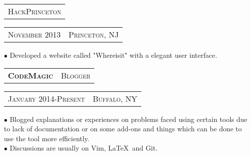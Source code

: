\documentclass[10pt,letterpaper,oneside]{article}
\begin{document}
    \vspace{-12pt}
    \begin{tabular}{c}
        {\small H\textsc{ack}P\textsc{rinceton}}
    \end{tabular}
    \hspace{4.7in}
    \textcolor{light-gray}{
        \begin{tabular}{c|c}
            {\small N\textsc{ovember 2013}}
            &{\small P\textsc{rinceton}, NJ}\\
        \end{tabular}
    }
    \vspace{-12pt}
    \begin{adjustwidth}{7pt}{0pt}
            {\footnotesize $\bullet$ Developed a website called "Whereisit" with a elegant user interface.}\\
    \end{adjustwidth}
    \vspace{-8pt}
    \begin{tabular}{c|c}
        \textbf{\normalsize C\textsc{ode}M\textsc{agic}}
        &\textmd{\normalsize B\textsc{logger}}
    \end{tabular}
    \hspace{3.85in}
    \textcolor{light-gray}{
        \begin{tabular}{c|c}
            {\small J\textsc{anuary 2014}-P\textsc{resent}}
            &{\small B\textsc{uffalo}, NY}\\
        \end{tabular}
    } 
    \vspace{-4mm}
    \begin{adjustwidth}{7pt}{0pt}
  {\footnotesize $\bullet$ Blogged explanations or experiences on problems faced using certain tools due to lack
            of documentation or on some add-ons and things which can be done to use the tool more efficiently.}\\
            {\footnotesize $\bullet$ Discussions are usually on Vim, \LaTeX \  and Git. }
    \end{adjustwidth}
    \vspace{10pt}
    \begin{comment}
        \begin{tabular}{c}
        \textbf{\normalsize A\textsc{ffiliations}}\\
        \end{tabular}
        \begin{adjustwidth}{7pt}{0pt}
            {\footnotesize \textbf{International Society of Technical Education(09-12)} -Participated in several events and
            organised a few events.}\\
            {\footnotesize \textbf{Computer Society of India(09-12)} -Member since 2009,organised few workshops and
        tutorial sessions.}
            \vspace{0pt}\\
        \end{adjustwidth} 
    \end{comment}
\end{document}

